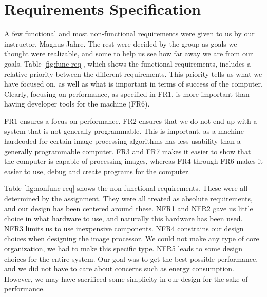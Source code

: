 \section{Requirements Specification}

 A few functional
and most non-functional requirements were given to us by our instructor, Magnus
Jahre. The rest were decided by the group as goals we thought were realizable, and
some to help us see how far away we are from our goals. Table
\ref{fig:func-req}, which shows the functional requirements, includes a relative
priority between the different requirements.  This priority tells us what we
have focused on, as well as what is important in terms of success of the
computer. Clearly, focusing on performance, as specified in {\sc FR1}, is more
important than having developer tools for the machine ({\sc FR6}).

{\sc FR1} ensures a focus on performance. {\sc FR2} ensures that we do not end
up with a system that is not generally programmable. This is important, as a
machine hardcoded for certain image processing algorithms has less usability than a generally
programmable computer. {\sc FR3} and {\sc FR7} makes it easier to show that the
computer is capable of processing images, whereas {\sc FR4} through {\sc FR6} makes it
easier to use, debug and create programs for the computer.



Table \ref{fig:nonfunc-req} shows the non-functional requirements. These were
all determined by the assignment. They were all treated as absolute requirements,
and our design has been centered around these. {\sc NFR1} and {\sc NFR2} gave us
little choice in what hardware to use, and naturally this hardware has been used. {\sc
  NFR3} limits us to use inexpensive components. {\sc NFR4} constrains our
design choices when designing the image processor. We could not make any type of core
organization, we had to make this specific type. {\sc NFR5} leads to some
design choices for the entire system. Our goal was to get the best possible performance, and we did not
have to care about concerns such as energy consumption. 
However, we may have sacrificed some simplicity in our design for
the sake of performance.
